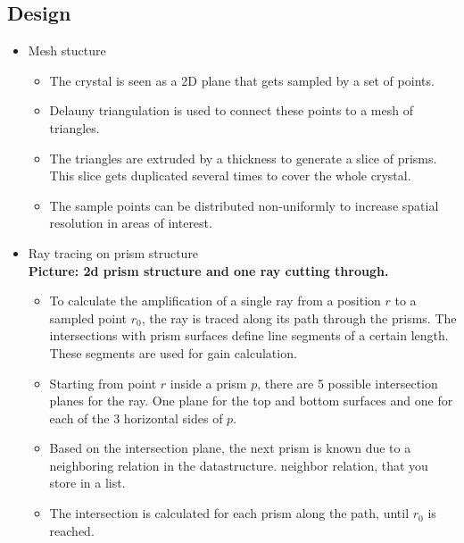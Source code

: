\subsection{Design}
\begin{itemize}
  \item Mesh stucture
    \begin{itemize}

      \item The crystal is seen as a 2D plane that gets sampled by a set of
        points. 

      \item Delauny triangulation is used to connect these points to a mesh of
        triangles.

      \item The triangles are extruded by a thickness to generate a slice of
        prisms. This slice gets duplicated several times to cover the whole
        crystal.

      \item The sample points can be distributed non-uniformly to increase
        spatial resolution in areas of interest.

    \end{itemize}

  \item Ray tracing on prism structure\\
    \textbf{Picture: 2d prism structure and one ray cutting through.}

    \begin{itemize}
      
      \item To calculate the amplification of a single ray from a position $r$
        to a sampled point $r_0$, the ray is traced along its path through the
        prisms. The intersections with prism surfaces define line segments of a
        certain length. These segments are used for gain calculation.

      \item Starting from point $r$ inside a prism $p$, there are 5 possible
        intersection planes for the ray. One plane for the top and bottom
        surfaces and one for each of the 3 horizontal sides of $p$.

      \item Based on the intersection plane, the next prism is known due to a
        neighboring relation in the datastructure.  neighbor relation, that you
        store in a list.

      \item The intersection is calculated for each prism along the path, until
        $r_0$ is reached.


\end{itemize}
\end{itemize}
